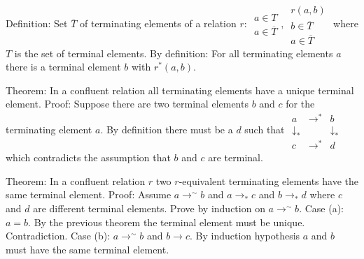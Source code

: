 \documentclass{article}
\newcommand{\rstar}[1]{#1^*}
\newcommand{\reqv}[1]{#1^\sim}
\newcommand{\tostar}{\rstar\to}
\newcommand{\rulev}[2]{\begin{array}{l} #1 \\ \hline #2\end{array}}
\begin{document}
Definition: Set $\overline T$ of terminating elements of a relation $r$:
$\rulev{a\in T}{a\in \overline T}$, $\rulev{r(a,b) \\ b\in\overline T}{a\in
  \overline T}$ where $T$ is the set of terminal elements. By definition: For
all terminating elements $a$ there is a terminal element $b$ with $\rstar
r(a,b)$.

Theorem: In a confluent relation all terminating elements have a unique
terminal element. Proof: Suppose there are two terminal elements $b$ and $c$
for the terminating element $a$. By definition there must be a $d$ such that
$\begin{matrix} a & \tostar & b \\
  \downarrow_* & & \downarrow_* \\
  c & \tostar & d
\end{matrix}$
which contradicts the assumption that $b$ and $c$ are terminal.


Theorem: In a confluent relation $r$ two $r$-equivalent terminating elements have the same
terminal element.
Proof: Assume $a \reqv\to b$ and $a \to_* c$ and $b \to_* d$
where $c$ and $d$ are different terminal elements. Prove by induction on $a
\reqv\to b$. Case (a): $a=b$. By the previous theorem the terminal element
must be unique. Contradiction. Case (b): $a \reqv\to b$ and $b \to c$. By
induction hypothesis $a$ and $b$ must have the same terminal element.
\end{document}
